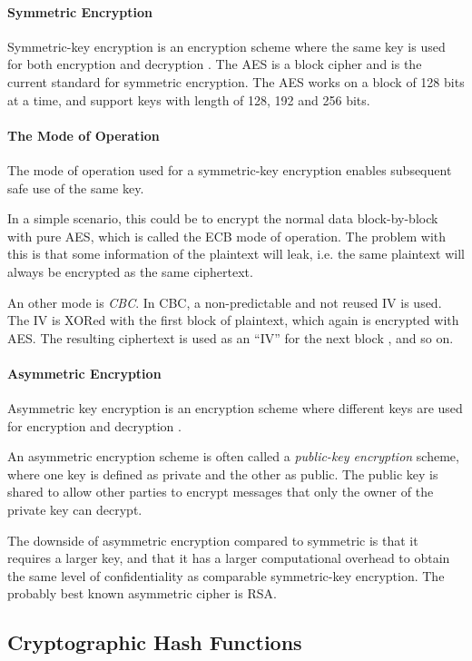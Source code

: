 \documentclass[pdftex,english,10pt,b5paper,twoside]{book}
\begin{document}
\paragraph{Symmetric Encryption} Symmetric-key encryption is an encryption scheme
where the same key is used for both encryption and decryption \cite[p.
32]{stallings}. The \ac{AES} is a block cipher and is the current standard for
symmetric encryption. The \ac{AES} works on a block of 128 bits at a time,
and support keys with length of 128, 192 and 256 bits.

\paragraph{The Mode of Operation} The mode of operation used for a
symmetric-key encryption enables subsequent safe use of the same key.

In a simple scenario, this could be to encrypt the normal data block-by-block
with pure \ac{AES}, which is called the \ac{ECB} mode of operation. The problem
with this is that some information of the plaintext will leak, i.e. the same
plaintext will always be encrypted as the same ciphertext.

An other mode is \emph{\ac{CBC}}. In \ac{CBC}, a non-predictable and not reused
\ac{IV} is used. The \ac{IV} is XORed with the first block of plaintext, which
again is encrypted with \ac{AES}. The resulting ciphertext is used as an
``\ac{IV}'' for the next block \cite[p. 183]{stallings}, and so on.

\paragraph{Asymmetric Encryption} Asymmetric key encryption is an encryption scheme
where different keys are used for encryption and decryption
\cite[p. 259]{stallings}.

An asymmetric encryption scheme is often called a \emph{public-key
encryption} scheme, where one key is defined as private and the other as public.
The public key is shared to allow other parties to encrypt messages that only the
owner of the private key can decrypt.

The downside of asymmetric encryption compared to symmetric is that it requires
a larger key, and that it has a larger computational overhead to obtain the
same level of confidentiality as comparable symmetric-key encryption. The
probably best known asymmetric cipher is \ac{RSA}.

\subsection{Cryptographic Hash Functions}
\end{document}
